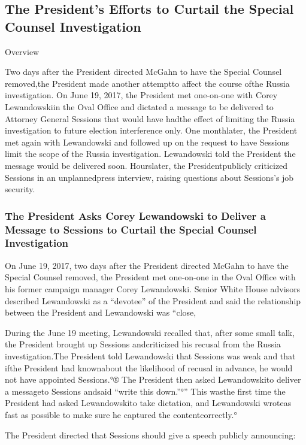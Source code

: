 {\subsection{The President's Efforts to Curtail the Special Counsel Investigation}

Overview

Two days after the President directed McGahn to have the Special Counsel removed,the President made another attemptto affect the course ofthe Russia investigation.
On June 19, 2017, the President met one-on-one with Corey Lewandowskiin the Oval Office and dictated a message to be delivered to Attorney General Sessions that would have hadthe effect of limiting the Russia investigation to future election interference only.
One monthlater, the President met again with Lewandowski and followed up on the request to have Sessions limit the scope of the Russia investigation.
Lewandowski told the President the message would be delivered soon.
Hourslater, the Presidentpublicly criticized Sessions in an unplannedpress interview, raising questions about Sessions’s job security.

\subsubsection{The President Asks Corey Lewandowski to Deliver a Message to Sessions to Curtail the Special Counsel Investigation}

On June 19, 2017, two days after the President directed McGahn to have the Special Counsel removed, the President met one-on-one in the Oval Office with his former campaign manager Corey Lewandowski.
Senior White House advisors described Lewandowski as a “devotee” of the President and said the relationship between the President and Lewandowski was “close,

During the June 19 meeting, Lewandowski recalled that, after some small talk, the President brought up Sessions andcriticized his recusal from the Russia investigation.The President told Lewandowski that Sessions was weak and that ifthe President had knownabout the likelihood of recusal in advance, he would not have appointed Sessions.°®
The President then asked Lewandowskito deliver a messageto Sessions andsaid “write this down.”°”
This wasthe first time the President had asked Lewandowskito take dictation, and Lewandowski wroteas fast as possible to make sure he captured the contentcorrectly.°

The President directed that Sessions should give a speech publicly announcing:

}
